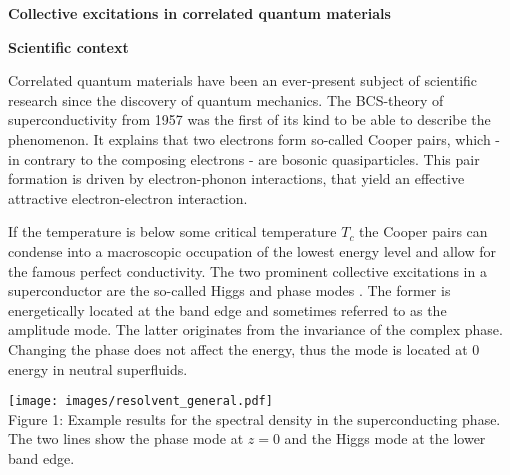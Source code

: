 \documentclass[20pt]{article}
\newcommand{\mchapter}[1]{ \begin{center} \color{tugreen!95!black} \LARGE \bf \textbf{#1} \end{center}} %
\newcommand{\msection}[1]{ { \vspace{5mm} \hspace{-6mm} \large \textbf{#1}} \vspace{2mm} } %
\newcommand{\mcaption}[2]{ \\ Figure {#1}: {#2} } %
\begin{document}
\sf

\myhead

\vspace{2mm}
\mchapter{Collective excitations in correlated quantum materials}
\vspace{-3mm}

\msection{Scientific context}

Correlated quantum materials have been an ever-present subject of scientific research since the discovery of quantum mechanics.
The BCS-theory of superconductivity\cite{theory_of_sc} from 1957 was the first of its kind to be able to describe the phenomenon.
It explains that two electrons form so-called Cooper pairs, which - in contrary to the composing electrons - are bosonic quasiparticles.
This pair formation is driven by electron-phonon interactions, that yield an effective attractive electron-electron interaction.

\vspace{10pt}
\begin{minipage}{0.40\textwidth}
    If the temperature is below some critical temperature $T_c$ the Cooper pairs can condense into a macroscopic occupation of the lowest energy level 
    and allow for the famous perfect conductivity.
    The two prominent collective excitations in a superconductor are the so-called Higgs and phase modes \cite{higgs, bo22}.
    The former is energetically located at the band edge and sometimes referred to as the amplitude mode.
    The latter originates from the invariance of the complex phase. 
    Changing the phase does not affect the energy, thus the mode is located at 0 energy in neutral superfluids.
\end{minipage}
\hspace{0.01\textwidth}
\begin{minipage}{0.58\textwidth}
    \begin{center}
        \texttt{[image: images/resolvent\_general.pdf]}
        \mcaption{1}{Example results for the spectral density in the superconducting phase.
            The two lines show the phase mode at $z=0$ and the Higgs mode at the lower band edge.}
    \end{center}
\end{minipage}
\vspace{10pt}
\end{document}

